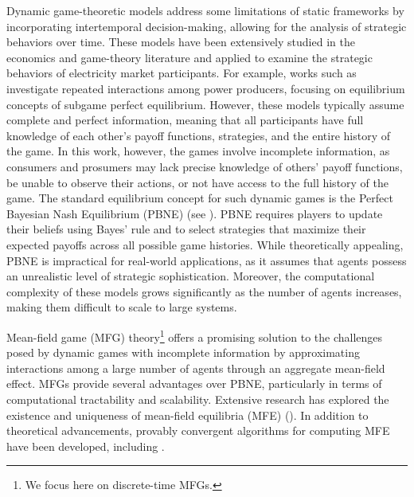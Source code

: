 \documentclass{article}
\theoremstyle{definition}
\theoremstyle{plain}
\begin{document}
Dynamic game-theoretic models address some limitations of static frameworks by incorporating intertemporal decision-making, allowing for the analysis of strategic behaviors over time. These models have been extensively studied in the economics and game-theory literature and applied to examine the strategic behaviors of electricity market participants. For example, works such as \cite{Liu_Collusion2, Liu_Collusion3, fabra2005price, anderson2011implicit} investigate repeated interactions among power producers, focusing on equilibrium concepts of subgame perfect equilibrium. However, these models typically assume complete and perfect information, meaning that all participants have full knowledge of each other's payoff functions, strategies, and the entire history of the game.
In this work, however, the games involve incomplete information, as consumers and prosumers may lack precise knowledge of others' payoff functions, be unable to observe their actions, or not have access to the full history of the game. The standard equilibrium concept for such dynamic games is the Perfect Bayesian Nash Equilibrium (PBNE) (see \cite{GameTheory}). PBNE requires players to update their beliefs using Bayes' rule and to select strategies that maximize their expected payoffs across all possible game histories. While theoretically appealing, PBNE is impractical for real-world applications, as it assumes that agents possess an unrealistic level of strategic sophistication. Moreover, the computational complexity of these models grows significantly as the number of agents increases, making them difficult to scale to large systems.

Mean-field game (MFG) theory\footnote{We focus here on discrete-time MFGs.} offers a promising solution to the challenges posed by dynamic games with incomplete information by approximating interactions among a large number of agents through an aggregate mean-field effect. 
MFGs provide several advantages over PBNE, particularly in terms of computational tractability and scalability. Extensive research has explored the existence and uniqueness of mean-field equilibria (MFE) (\cite{adlakha2013mean,light2022mean, MarkovNash}). 
In addition to theoretical advancements, provably convergent algorithms for computing MFE have been developed, including \cite{guo2019learning, gu2024mean, Yang_LearnPlayMFG}.
\end{document}

